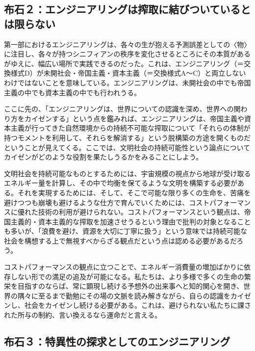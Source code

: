 \subsection{布石２：エンジニアリングは搾取に結びついているとは限らない}\label{ux5e03ux77f3uxff12ux30a8ux30f3ux30b8ux30cbux30a2ux30eaux30f3ux30b0ux306fux643eux53d6ux306bux7d50ux3073ux3064ux3044ux3066ux3044ux308bux3068ux306fux9650ux3089ux306aux3044}

第一部におけるエンジニアリングは、各々の生が抱える予測誤差としての〈物〉に注目し、各々が持つシニフィアンの秩序を変化させるところにその本質があるがゆえに、幅広い場所で実践できるのだった。これは、エンジニアリング（＝交換様式D）が未開社会・帝国主義・資本主義（＝交換様式A～C）と両立しないわけではないことを意味している。エンジニアリングは、未開社会の中でも帝国主義の中でも資本主義の中でも行われうる。

ここに先の、「エンジニアリングは、世界についての認識を深め、世界への関わり方をカイゼンする」という点を鑑みれば、エンジニアリングは、帝国主義や資本主義が行ってきた自然環境からの持続不可能な搾取について「それらの体制が持つモメントを利用して、それらを解消する」という脱構築の方途を開くものだということが見えてくる。ここでは、文明社会の持続可能性という論点についてカイゼンがどのような役割を果たしうるかをみることにしよう。

文明社会を持続可能なものとするためには、宇宙規模の視点から地球が受け取るエネルギー量を計算し、その中で均衡を保てるような文明を構築する必要がある。それを実現するためには、そして、そこで可能な限り多くの生命を、苦痛を避けつつも崩壊も避けるような仕方で育んでいくためには、コストパフォーマンスに優れた技術の利用が避けられない。コストパフォーマンスという観点は、帝国主義的・資本主義的な搾取を加速させうるという理由で批判の対象となることも多いが、「浪費を避け、資源を大切に丁寧に扱う」という意味では持続可能な社会を構想する上で無視すべからざる観点だという点は認める必要があるだろう。

コストパフォーマンスの観点に立つことで、エネルギー消費量の増加ばかりに依存しない形での満足の追及が可能になる。私たちは、より多様で多くの生命の繁栄を目指すのならば、常に顕現し続ける予想外の出来事へと知的関心を開き、世界の隅々に至るまで勤勉にその場の文脈を読み解きながら、自らの認識をカイゼンし、社会をカイゼンし続ける必要がある。これは、避けられない私たちに課された所与の制約、言い換えるなら運命だと言える。

\subsection{布石３：特異性の探求としてのエンジニアリング}\label{ux5e03ux77f3uxff13ux7279ux7570ux6027ux306eux63a2ux6c42ux3068ux3057ux3066ux306eux30a8ux30f3ux30b8ux30cbux30a2ux30eaux30f3ux30b0}

